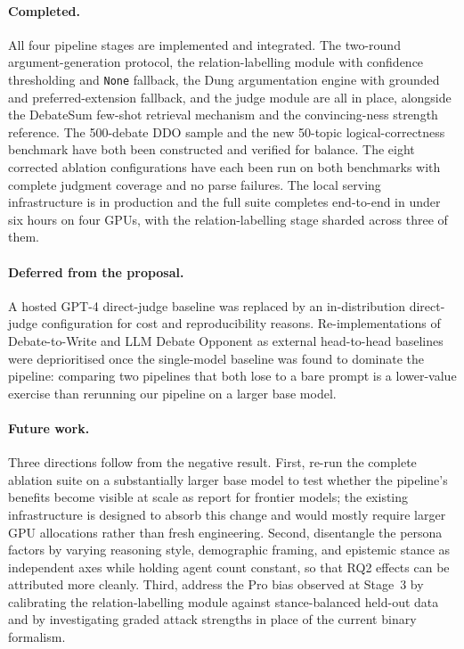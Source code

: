 \documentclass[11pt,twocolumn,letterpaper]{article}
\newcommand{\HumanTestTopics}{50}
\newcommand{\DDOSample}{500}
\begin{document}
\paragraph{Completed.}
All four pipeline stages are implemented and integrated. The
two-round argument-generation protocol, the relation-labelling
module with confidence thresholding and \texttt{None} fallback,
the Dung argumentation engine with grounded and preferred-extension
fallback, and the judge module are all in place, alongside the
DebateSum few-shot retrieval mechanism and the convincing-ness
strength reference. The \DDOSample-debate DDO sample and the new
\HumanTestTopics-topic logical-correctness benchmark have both
been constructed and verified for balance. The eight corrected
ablation configurations have each been run on both benchmarks with
complete judgment coverage and no parse failures. The local
serving infrastructure is in production and the full suite
completes end-to-end in under six hours on four GPUs, with the
relation-labelling stage sharded across three of them.

\paragraph{Deferred from the proposal.}
A hosted GPT-4 direct-judge baseline was replaced by an
in-distribution direct-judge configuration for cost and
reproducibility reasons. Re-implementations of Debate-to-Write and
LLM Debate Opponent as external head-to-head baselines were
deprioritised once the single-model baseline was found to dominate
the pipeline: comparing two pipelines that both lose to a bare
prompt is a lower-value exercise than rerunning our pipeline on a
larger base model.

\paragraph{Future work.}
Three directions follow from the negative result. First, re-run
the complete ablation suite on a substantially larger base model to
test whether the pipeline's benefits become visible at scale as
\citet{du2023multiagent} report for frontier models; the existing
infrastructure is designed to absorb this change and would mostly
require larger GPU allocations rather than fresh engineering.
Second, disentangle the persona factors by varying reasoning style,
demographic framing, and epistemic stance as independent axes while
holding agent count constant, so that RQ2 effects can be
attributed more cleanly. Third, address the Pro bias observed at
Stage~3 by calibrating the relation-labelling module against
stance-balanced held-out data and by investigating graded attack
strengths in place of the current binary formalism.
\end{document}
